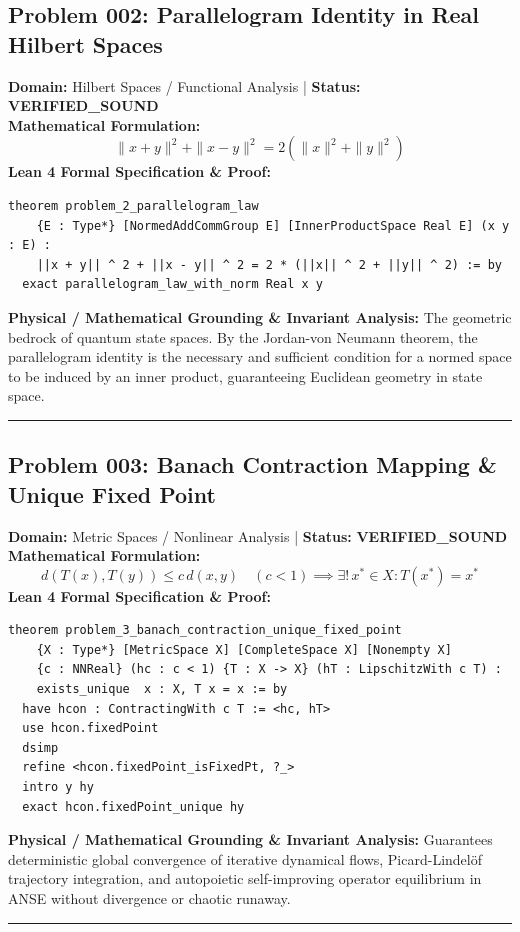 \documentclass[10pt,a4paper]{article}
\begin{document}
\subsection*{Problem 002: Parallelogram Identity in Real Hilbert Spaces}
\textbf{Domain:} Hilbert Spaces / Functional Analysis \quad | \quad \textbf{Status:} \textcolor{green!70!black}{\textbf{VERIFIED\_SOUND}}\\
\textbf{Mathematical Formulation:}
\begin{equation*}
  \|x + y\|^2 + \|x - y\|^2 = 2(\|x\|^2 + \|y\|^2)
\end{equation*}
\textbf{Lean 4 Formal Specification \& Proof:}
\begin{lstlisting}
theorem problem_2_parallelogram_law
    {E : Type*} [NormedAddCommGroup E] [InnerProductSpace Real E] (x y : E) :
    ||x + y|| ^ 2 + ||x - y|| ^ 2 = 2 * (||x|| ^ 2 + ||y|| ^ 2) := by
  exact parallelogram_law_with_norm Real x y
\end{lstlisting}
\textbf{Physical / Mathematical Grounding \& Invariant Analysis:}
The geometric bedrock of quantum state spaces. By the Jordan-von Neumann theorem, the parallelogram identity is the necessary and sufficient condition for a normed space to be induced by an inner product, guaranteeing Euclidean geometry in state space.
\vspace{0.8em}\hrule\vspace{0.8em}
\subsection*{Problem 003: Banach Contraction Mapping \& Unique Fixed Point}
\textbf{Domain:} Metric Spaces / Nonlinear Analysis \quad | \quad \textbf{Status:} \textcolor{green!70!black}{\textbf{VERIFIED\_SOUND}}\\
\textbf{Mathematical Formulation:}
\begin{equation*}
  d(T(x), T(y)) \le c\, d(x, y) \quad (c < 1) \implies \exists!\, x^* \in X: T(x^*) = x^*
\end{equation*}
\textbf{Lean 4 Formal Specification \& Proof:}
\begin{lstlisting}
theorem problem_3_banach_contraction_unique_fixed_point
    {X : Type*} [MetricSpace X] [CompleteSpace X] [Nonempty X]
    {c : NNReal} (hc : c < 1) {T : X -> X} (hT : LipschitzWith c T) :
    exists_unique  x : X, T x = x := by
  have hcon : ContractingWith c T := <hc, hT>
  use hcon.fixedPoint
  dsimp
  refine <hcon.fixedPoint_isFixedPt, ?_>
  intro y hy
  exact hcon.fixedPoint_unique hy
\end{lstlisting}
\textbf{Physical / Mathematical Grounding \& Invariant Analysis:}
Guarantees deterministic global convergence of iterative dynamical flows, Picard-Lindelöf trajectory integration, and autopoietic self-improving operator equilibrium in ANSE without divergence or chaotic runaway.
\vspace{0.8em}\hrule\vspace{0.8em}
\end{document}
